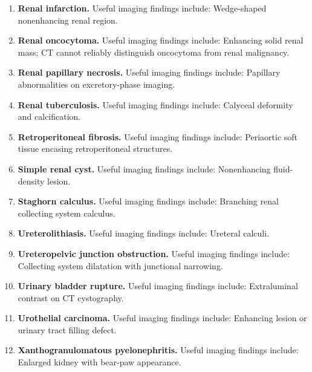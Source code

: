 \begin{enumerate}[leftmargin=*,itemsep=0.45em,topsep=0.4em]
\item \textbf{Renal infarction.} Useful imaging findings include: Wedge-shaped nonenhancing renal region.
\item \textbf{Renal oncocytoma.} Useful imaging findings include: Enhancing solid renal mass; CT cannot reliably distinguish oncocytoma from renal malignancy.
\item \textbf{Renal papillary necrosis.} Useful imaging findings include: Papillary abnormalities on excretory-phase imaging.
\item \textbf{Renal tuberculosis.} Useful imaging findings include: Calyceal deformity and calcification.
\item \textbf{Retroperitoneal fibrosis.} Useful imaging findings include: Periaortic soft tissue encasing retroperitoneal structures.
\item \textbf{Simple renal cyst.} Useful imaging findings include: Nonenhancing fluid-density lesion.
\item \textbf{Staghorn calculus.} Useful imaging findings include: Branching renal collecting system calculus.
\item \textbf{Ureterolithiasis.} Useful imaging findings include: Ureteral calculi.
\item \textbf{Ureteropelvic junction obstruction.} Useful imaging findings include: Collecting system dilatation with junctional narrowing.
\item \textbf{Urinary bladder rupture.} Useful imaging findings include: Extraluminal contrast on CT cystography.
\item \textbf{Urothelial carcinoma.} Useful imaging findings include: Enhancing lesion or urinary tract filling defect.
\item \textbf{Xanthogranulomatous pyelonephritis.} Useful imaging findings include: Enlarged kidney with bear-paw appearance.
\end{enumerate}

